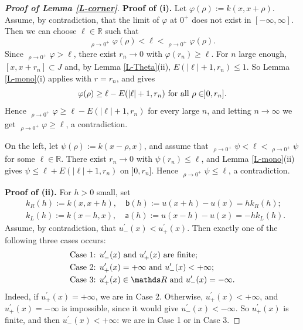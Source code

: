 \documentclass[reqno,12pt]{amsart}
\numberwithin{equation}{section}
\def\RR{{\mathds R}}
\def\limsup{\mathop{\overline{\lim}}}
\def\liminf{\mathop{\underline{\lim}}}
\theoremstyle{remark}
\begin{document}
\begin{proof}[\bf Proof of Lemma \ref{L-corner}]
{\bf Proof of (i).} Let $\varphi(\rho):=k(x,x+\rho)$. Assume, by contradiction, that the limit of $\varphi$ at $0^+$ does not exist in $[-\infty,\infty]$. Then we can choose $\ell\in\RR$ such that
\begin{equation*}
\liminf_{\rho\to0^+}\varphi(\rho)<\ell<\limsup_{\rho\to0^+}\varphi(\rho).
\end{equation*}
Since $\limsup_{\rho\to0^+}\varphi>\ell$, there exist $r_n\to0$ with $\varphi(r_n)\geq\ell$. For $n$ large enough, $[x,x+r_n]\subset J$ and, by Lemma \ref{L-Theta}(ii), $E(|\ell|+1,r_n)\leq1$. So Lemma \ref{L-mono}(i) applies with $r=r_n$, and gives
\begin{equation*}
\varphi(\rho)\geq\ell-E(|\ell|+1,r_n)\hbox{ for all }\rho\in]0,r_n].
\end{equation*}
Hence $\liminf_{\rho\to0^+}\varphi\geq\ell-E(|\ell|+1,r_n)$ for every large $n$, and letting $n\to\infty$ we get $\liminf_{\rho\to0^+}\varphi\geq\ell$, a contradiction.

\smallskip

On the left, let $\psi(\rho):=k(x-\rho,x)$, and assume that $\liminf_{\rho\to0^+}\psi<\ell<\limsup_{\rho\to0^+}\psi$ for some $\ell\in\RR$. There exist $r_n\to0$ with $\psi(r_n)\leq\ell$, and Lemma \ref{L-mono}(ii) gives $\psi\leq\ell+E(|\ell|+1,r_n)$ on $]0,r_n]$. Hence $\limsup_{\rho\to0^+}\psi\leq\ell$, a contradiction.

\medskip

{\bf Proof of (ii).} For $h>0$ small, set
\begin{align*}
&k_R(h):=k(x,x+h),\quad\mathsf{b}(h):=u(x+h)-u(x)=hk_R(h);\\
&k_L(h):=k(x-h,x),\quad\mathsf{a}(h):=u(x-h)-u(x)=-hk_L(h).
\end{align*}
Assume, by contradiction, that $u^\prime_-(x)<u^\prime_+(x)$. Then exactly one of the following three cases occurs:
\begin{align*}
&\hbox{Case 1: }u^\prime_-(x)\hbox{ and }u^\prime_+(x)\hbox{ are finite};\\
&\hbox{Case 2: }u^\prime_+(x)=+\infty\hbox{ and }u^\prime_-(x)<+\infty;\\
&\hbox{Case 3: }u^\prime_+(x)\in\RR\hbox{ and }u^\prime_-(x)=-\infty.
\end{align*}
Indeed, if $u^\prime_+(x)=+\infty$, we are in Case 2. Otherwise, $u^\prime_+(x)<+\infty$, and $u^\prime_+(x)=-\infty$ is impossible, since it would give $u^\prime_-(x)<-\infty$. So $u^\prime_+(x)$ is finite, and then $u^\prime_-(x)<+\infty$: we are in Case 1 or in Case 3.


\end{proof}
\end{document}
